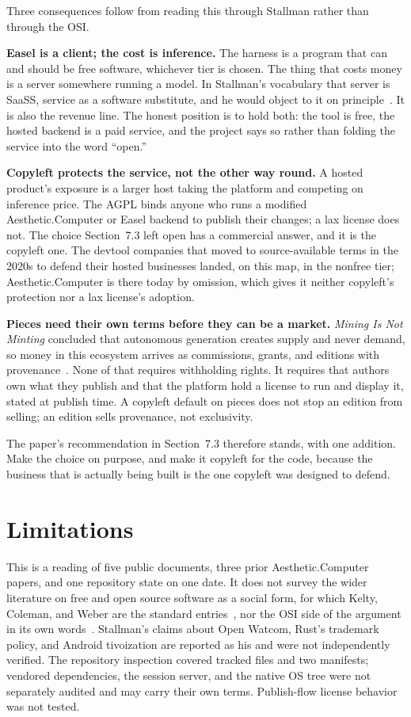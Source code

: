 \documentclass[10pt,letterpaper,twocolumn]{article}
\newcommand{\acdot}{{\color{acpink}.}}
\newcommand{\ac}{Aesthetic{\acdot}Computer}
\newcommand{\term}[1]{``#1''}
\begin{document}
Three consequences follow from reading this through Stallman rather than through the OSI.

\textbf{Easel is a client; the cost is inference.} The harness is a program that can and should be free software, whichever tier is chosen. The thing that costs money is a server somewhere running a model. In Stallman's vocabulary that server is SaaSS, service as a software substitute, and he would object to it on principle~\citep{gnu_words}. It is also the revenue line. The honest position is to hold both: the tool is free, the hosted backend is a paid service, and the project says so rather than folding the service into the word \term{open.}

\textbf{Copyleft protects the service, not the other way round.} A hosted product's exposure is a larger host taking the platform and competing on inference price. The AGPL binds anyone who runs a modified \ac{} or Easel backend to publish their changes; a lax license does not. The choice Section~7.3 left open has a commercial answer, and it is the copyleft one. The devtool companies that moved to source-available terms in the 2020s to defend their hosted businesses landed, on this map, in the nonfree tier; \ac{} is there today by omission, which gives it neither copyleft's protection nor a lax license's adoption.

\textbf{Pieces need their own terms before they can be a market.} \emph{Mining Is Not Minting} concluded that autonomous generation creates supply and never demand, so money in this ecosystem arrives as commissions, grants, and editions with provenance~\citep{scudder2026market}. None of that requires withholding rights. It requires that authors own what they publish and that the platform hold a license to run and display it, stated at publish time. A copyleft default on pieces does not stop an edition from selling; an edition sells provenance, not exclusivity.

The paper's recommendation in Section~7.3 therefore stands, with one addition. Make the choice on purpose, and make it copyleft for the code, because the business that is actually being built is the one copyleft was designed to defend.

\section{Limitations}

This is a reading of five public documents, three prior \ac{} papers, and one repository state on one date. It does not survey the wider literature on free and open source software as a social form, for which Kelty, Coleman, and Weber are the standard entries~\citep{kelty2008twobits,coleman2013coding,weber2004success}, nor the OSI side of the argument in its own words~\citep{raymond1999cathedral}. Stallman's claims about Open Watcom, Rust's trademark policy, and Android tivoization are reported as his and were not independently verified. The repository inspection covered tracked files and two manifests; vendored dependencies, the session server, and the native OS tree were not separately audited and may carry their own terms. Publish-flow license behavior was not tested.
\end{document}
